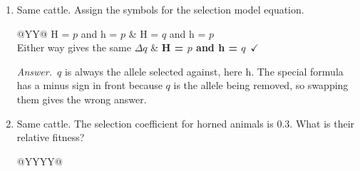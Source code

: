 \documentclass[11pt]{article}
\newcommand{\keyans}[1]{\par\medskip\noindent\textit{Answer.}\ #1\par\medskip}
\begin{document}
\begin{enumerate}[label=\textbf{\arabic*.}, leftmargin=2em, itemsep=1.4em]
\nopagebreak\par{}
\par\smallskip
\begin{enumerate}[label={}, leftmargin=2.4em, labelwidth=0pt, itemsep=2pt, topsep=0pt]
\item \hspace*{-2.4em}No special model applies
\item \hspace*{-2.4em}\textbf{Complete dominance with selection against the recessive}\ \(\checkmark\)
\item \hspace*{-2.4em}Complete dominance with selection against the dominant
\item \hspace*{-2.4em}Heterozygote advantage
\end{enumerate}
\keyans{Only hh animals have horns, so only hh is hurt. The allele selected against is recessive. This is the same setup as last year's yak question.}
\item Same cattle. Assign the symbols for the selection model equation.
\nopagebreak\par{}
\par\smallskip\noindent\begin{tabularx}{\linewidth}{@{}YY@{}}
H = \(p\) and h = \(p\) & H = \(q\) and h = \(p\) \\[3pt]
Either way gives the same \(\Delta q\) & \textbf{H = \(p\) and h = \(q\)}\ \(\checkmark\) \\
\end{tabularx}
\keyans{\(q\) is always the allele selected against, here h. The special formula has a minus sign in front because \(q\) is the allele being removed, so swapping them gives the wrong answer.}
\item Same cattle. The selection coefficient for horned animals is 0.3. What is their relative fitness?
\nopagebreak\par{}
\par\smallskip\noindent\begin{tabularx}{\linewidth}{@{}YYYY@{}}

\end{tabularx}
\end{enumerate}
\end{document}
